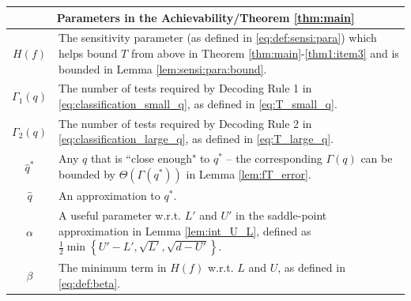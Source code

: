 \documentclass[onecolumn,letterpaper]{IEEEtran}
\newcommand{\cp}{{q}}
\newcommand{\cpn}{{\cp^*}}
\newcommand{\up}{{U}}
\newcommand{\lw}{{L}}
\newcommand{\ap}{{\alpha}}
\newcommand{\fH}{{H(f)}}
\newcommand{\bet}{{\beta}}
\newcommand{\ftau}{{\Gamma}}
\newcommand{\fT}{{\ftau(\cp)}}
\newcommand{\fTo}{\ftau_1(\cp)}
\newcommand{\fTt}{\ftau_2(\cp)}
\newcommand{\fTn}{\ftau (\cpn)}
\newcommand{\cph}{{\hat{\cp}^*}}
\newcommand{\cphglobal}{{\hat{\cp}}}
\begin{document}
\begin{table}
\begin{tabular}{|c|l|}
     \multicolumn{2}{|c|}{{\bf Parameters in the Achievability/Theorem \ref{thm:main}}}
        \\\hline
        $\fH$ & The sensitivity parameter (as defined in \eqref{eq:def:sensi:para}) which helps bound $T$ from above in Theorem \ref{thm:main}-\ref{thm1:item3} and is bounded in Lemma \ref{lem:sensi:para:bound}.
        \\\hline
        $\fTo$& The number of tests required by Decoding Rule 1 in \eqref{eq:classification_small_q}, as defined in \eqref{eq:T_small_q}. 
        \\\hline
        $\fTt$ & The number of tests required by Decoding Rule 2 in \eqref{eq:classification_large_q}, as defined in \eqref{eq:T_large_q}. 
        \\\hline
        $\cph$ & Any $\cp$ that is ``close enough" to $\cpn$ -- the corresponding $\fT$ can be bounded by $\Theta(\fTn)$ in Lemma \ref{lem:fT_error}.
        \\\hline
        $\cphglobal$ & An approximation to $\cpn$. 
        \\\hline
        $\ap$ & A useful parameter w.r.t. $\lw'$ and $\up'$ in the saddle-point approximation in Lemma \ref{lem:int_U_L}, defined as $\frac{1}{2} \min\left\{\up'-\lw',\sqrt{\lw'},\sqrt{d-\up'}\right\}$. 
        \\\hline
        $\bet$ & The minimum term in $\fH$ w.r.t. $\lw$ and $\up$, as defined in \eqref{eq:def:beta}. 
        \\\hline
        


\end{tabular}
\end{table}
\end{document}

